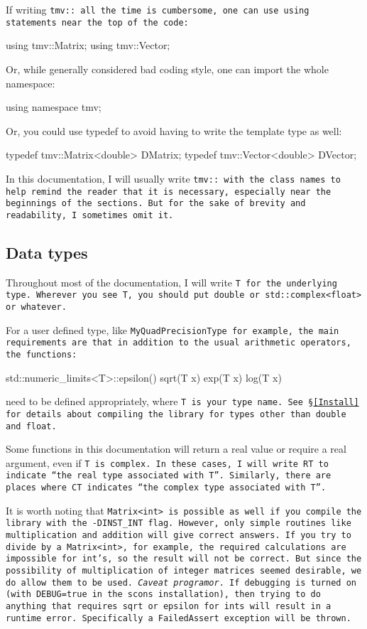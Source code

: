 If writing \tt{tmv::} all the time is cumbersome, one can use \tt{using}
statements near the top of the code:
\begin{tmvcode}
using tmv::Matrix;
using tmv::Vector;
\end{tmvcode}
Or, while generally considered bad coding style, one can import the whole namespace:
\begin{tmvcode}
using namespace tmv;
\end{tmvcode}
Or, you could use typedef to avoid having to write the template type as well:
\begin{tmvcode}
typedef tmv::Matrix<double> DMatrix;
typedef tmv::Vector<double> DVector;
\end{tmvcode}
In this documentation, I will usually write \tt{tmv::} with the class names to help remind the reader
that it is necessary, especially near the 
beginnings of the sections.  
But for the sake of brevity and readability, I sometimes omit it.

\subsection {Data types}

Throughout most of the documentation, I will write \tt{T} for the underlying type.
Wherever you see \tt{T}, you should put \tt{double} or \tt{std::complex<float>} or whatever.

For a user defined type, like \tt{MyQuadPrecisionType} for example, the main requirements are that 
in addition to the usual arithmetic operators, the functions:
\begin{tmvcode}
std::numeric_limits<T>::epsilon()
sqrt(T x) 
exp(T x) 
log(T x)
\end{tmvcode}
need to be defined appropriately, where \tt{T} is your type name.  See \S\ref{Install} for details about
compiling the library for types other than \tt{double} and \tt{float}.

Some functions in this documentation will return a real value or require a real argument, 
even if \tt{T} is complex.  In these cases, I will write \tt{RT} to indicate 
``the real type associated with \tt{T}''.  Similarly, there are places where \tt{CT}
indicates ``the complex type associated with \tt{T}''.

It is worth noting that \tt{Matrix<int>} is possible as well if you compile the library
with the \tt{-DINST\_INT} flag. 
However, only simple 
routines like multiplication and addition will give correct answers.  If you try to 
divide by a \tt{Matrix<int>}, for example, the required calculations are impossible 
for \tt{int}'s,
so the result will not be correct.  But since the possibility of multiplication of 
integer matrices seemed desirable, we do allow them to be used.  
\emph{Caveat programor}.  If debugging is turned on (with \tt{DEBUG=true} in the scons installation), 
then trying to do anything that requires
\tt{sqrt} or \tt{epsilon} for \tt{int}s will result in a runtime error.  Specifically a 
\tt{FailedAssert} exception will be thrown.

